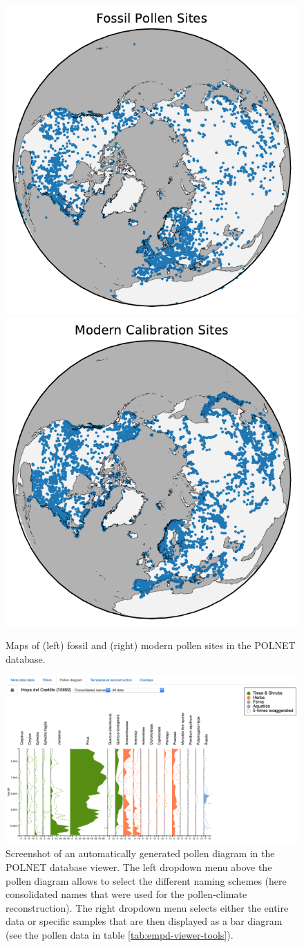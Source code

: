 \begin{refsection}
\begin{figure}
	\centering
	\includegraphics[width=0.45\linewidth]{empd-figures/fossil-sites.pdf}
	\includegraphics[width=0.45\linewidth]{empd-figures/modern-sites.pdf}
	\caption[Map of sites in the POLNET database]{Maps of (left) fossil and (right) modern pollen sites in the POLNET database.}
	\label{fig:polnet-sites}
\end{figure}

\begin{figure}[h]
	\includegraphics[width=\linewidth]{empd-figures/polnet-diagram.png}
	\caption{Screenshot of an automatically generated pollen diagram in the POLNET database viewer. The left dropdown menu above the pollen diagram allows to select the different naming schemes (here consolidated names that were used for the pollen-climate reconstruction). The right dropdown menu selects either the entire data or specific samples that are then displayed as a bar diagram (see the pollen data in table \ref{tab:empd-viewer-tools}).}
	\label{fig:polnet-pollen-diagram}
\end{figure}


\end{refsection}
